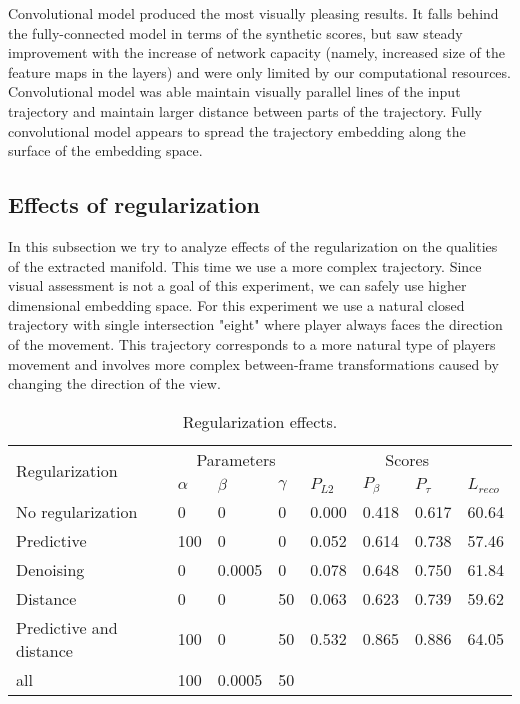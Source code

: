 Convolutional model produced the most visually pleasing results. It falls behind the fully-connected model in terms of the synthetic scores, but saw steady improvement with the increase of network capacity (namely, increased size of the feature maps in the layers) and were only limited by our computational resources. Convolutional model was able maintain visually parallel lines of the input trajectory and maintain larger distance between parts of the trajectory. Fully convolutional model appears to spread the trajectory embedding along the surface of the embedding space.

\subsection{Effects of regularization}

In this subsection we try to analyze effects of the regularization on the qualities of the extracted manifold. This time we use a more complex trajectory. Since visual assessment is not a goal of this experiment, we can safely use higher dimensional embedding space. For this experiment we use a natural closed trajectory with single intersection "eight" where player always faces the direction of the movement. This trajectory corresponds to a more natural type of players movement and involves more complex between-frame transformations caused by changing the direction of the view.

\begin{table}
\begin{center}
    \begin{tabular}{| l | l | l | l | l | l | l | l |}
    \hline
    \multirow{2}{*}{Regularization}      &\multicolumn{3}{|c|}{Parameters} & \multicolumn{4}{|c|}{Scores}  \\   \cline{2-8}

     & $\alpha$ & $\beta$ & $\gamma$    &  $P_{L2}$ & $P_{\beta}$ & $P_{\tau}$ & $L_{reco}$ \\ \hline

		No regularization 	& 0    & 0 & 0 & 0.000 & 0.418 & 0.617 & 60.64 \\
		Predictive          & 100  & 0 & 0 & 0.052 & 0.614 & 0.738 & 57.46 \\
		Denoising           & 0    & 0.0005 & 0 & 0.078 & 0.648 & 0.750 & 61.84 \\
		Distance            & 0    & 0 & 50 & 0.063 & 0.623 & 0.739 & 59.62 \\
    Predictive and distance& 100 & 0 & 50 & 0.532 & 0.865 & 0.886 & 64.05 \\
		all   & 100 & 0.0005 & 50 & & & &													\\ \hline
    \end{tabular}
\end{center}
  \caption{Regularization effects.}
  \label{tab:8emb}
\end{table}

